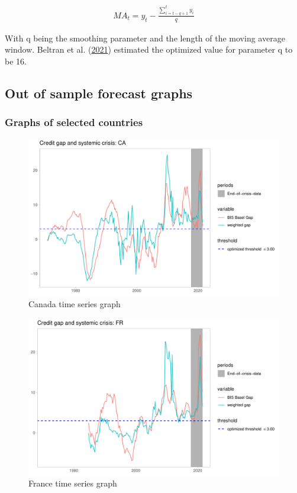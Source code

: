 \documentclass[
  12pt,
]{article}
\begin{document}
\begin{align*}
MA_t = y_t - \frac{\sum\nolimits^t_{i=t-q+1}y_i}{q}
\end{align*}

With q being the smoothing parameter and the length of the moving average window. Beltran et al. (\protect\hyperlink{ref-beltran_optimizing_2021}{2021}) estimated the optimized value for parameter q to be 16.

\hypertarget{out-of-sample-forecast-graphs}{%
\subsection{Out of sample forecast graphs}\label{out-of-sample-forecast-graphs}}

\hypertarget{graphs-other}{%
\subsubsection{Graphs of selected countries}\label{graphs-other}}

\begin{figure}[H]

{\centering \includegraphics[width=0.85\linewidth]{../Data/Output/Graphs/All/Weighted_credit_gap_CA} 

}

\caption{Canada time series graph}\label{fig:CAseries}
\end{figure}

\begin{figure}[H]

{\centering \includegraphics[width=0.85\linewidth]{../Data/Output/Graphs/All/Weighted_credit_gap_FR} 

}

\caption{France time series graph}\label{fig:FRseries}
\end{figure}
\end{document}
